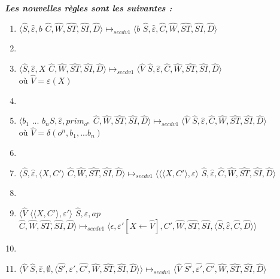 \documentclass[10pt,a4paper]{article}
\begin{document}
					
					\textbf{\textit{Les nouvelles règles sont les suivantes :}}
					\smallbreak
					\begin{enumerate}
					\item $\langle\widehat{S},\widehat{\varepsilon},b$ $\widehat{C},\widehat{W},\widehat{ST},\widehat{SI},\widehat{D}\rangle \longmapsto_{secdv1} \langle b$ $\widehat{S},\widehat{\varepsilon},\widehat{C},\widehat{W},\widehat{ST},\widehat{SI},\widehat{D}\rangle$
					\item[]
					\item $\langle\widehat{S},\widehat{\varepsilon},X$ $\widehat{C},\widehat{W},\widehat{ST},\widehat{SI},\widehat{D}\rangle \longmapsto_{secdv1} \langle \widehat{V}$ $\widehat{S},\widehat{\varepsilon},\widehat{C},\widehat{W},\widehat{ST},\widehat{SI},\widehat{D}\rangle$ 
					\\où $\widehat{V} = \varepsilon(X)$
					\item[]
					\item $\langle b_{1}$ $...$ $b_{n}\widehat{S},\widehat{\varepsilon},prim_{o^{n}}$ $\widehat{C},\widehat{W},\widehat{ST},\widehat{SI},\widehat{D}\rangle \longmapsto_{secdv1} \langle \widehat{V}$ $\widehat{S},\widehat{\varepsilon},\widehat{C},\widehat{W},\widehat{ST},\widehat{SI},\widehat{D}\rangle$ 
					\\où $\widehat{V} = \delta(o^{n},b_1,...b_{n})$
					\item[]
					\item $\langle\widehat{S},\widehat{\varepsilon},\langle X,C'\rangle$ $\widehat{C},\widehat{W},\widehat{ST},\widehat{SI},\widehat{D}\rangle \longmapsto_{secdv1} \langle\langle\langle X,C'\rangle,\varepsilon\rangle$ $\widehat{S},\widehat{\varepsilon},\widehat{C},\widehat{W},\widehat{ST},\widehat{SI},\widehat{D}\rangle$
					\item[]
					\item $\langle\widehat{V}$ $\langle\langle X,C'\rangle,\varepsilon'\rangle$ $\widehat{S},\widehat{\varepsilon},ap$ $\widehat{C},\widehat{W},\widehat{ST},\widehat{SI},\widehat{D}\rangle \longmapsto_{secdv1} \langle\epsilon,\varepsilon'[X \leftarrow \widehat{V}],C',\widehat{W},\widehat{ST},\widehat{SI},\langle\widehat{S},\widehat{\varepsilon},\widehat{C},\widehat{D}\rangle\rangle$
					\item[]
					\item $\langle\widehat{V}$ $\widehat{S},\widehat{\varepsilon},\emptyset,\langle\widehat{S'},\widehat{\varepsilon'},\widehat{C'},\widehat{W},\widehat{ST},\widehat{SI},\widehat{D}\rangle\rangle \longmapsto_{secdv1} \langle \widehat{V}$ $\widehat{S'},\widehat{\varepsilon'},\widehat{C'},\widehat{W},\widehat{ST},\widehat{SI},\widehat{D}\rangle$

\end{enumerate}
\end{document}
